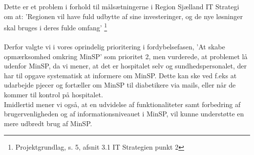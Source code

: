 Dette er et problem i forhold til målsætningerne i Region Sjælland IT Strategi om at: 'Regionen vil have fuld udbytte af sine investeringer, og de nye løsninger skal bruges i deres fulde omfang' \footnote{Projektgrundlag, s. 5, afsnit 3.1 IT Strategien punkt 2}\\
\\
Derfor valgte vi i vores oprindelig prioritering i fordybelsefasen, 'At skabe opmærksomhed omkring MinSP' som prioritet 2, men vurderede, at problemet lå udenfor MinSP, da vi mener, at det er hospitalet selv og sundhedspersonalet, der har til opgave systematisk at informere om MinSP. Dette kan ske ved f.eks at udarbejde pjecer og fortæller om MinSP til diabetikere via mails, eller når de kommer til kontrol på hospitalet. \\
Imidlertid mener vi også, at en udvidelse af funktionaliteter samt forbedring af brugervenligheden og af informationsniveauet i MinSP, vil kunne understøtte en mere udbredt brug af MinSP.
